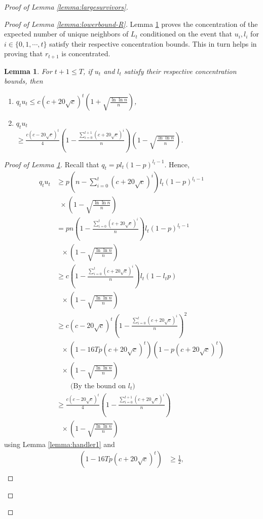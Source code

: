 \documentclass[11pt]{article}
\newtheorem{lemma}[theorem]{Lemma}
\begin{document}
\begin{proof}[Proof of Lemma \ref{lemma:largesurvivors}]
\begin{proof}[Proof of Lemma \ref{lemma:lowerbound-R}]
Lemma \ref{lemma:lowerbound-qu} proves the concentration of the expected number of unique neighbors of $L_t$ conditioned on the event that $u_i,l_i$ for $i\in\{0,1,\cdots,t\}$ satisfy their respective concentration bounds. This in turn helps in proving that $r_{t+1}$ is concentrated.
\begin{lemma}\label{lemma:lowerbound-qu}
For $t+1\leq T$, if $u_t$ and $l_t$ satisfy their respective concentration bounds, then
\begin{enumerate}
\item $q_tu_t \leq c(c+20\sqrt{c})^{t}\left(1+\sqrt{\frac{\ln{\ln{n}}}{n}}\right)$,
\item $q_tu_t$\\
$\geq \frac{c(c-20\sqrt{c})^{t}}{4} \left(1-\frac{\sum_{i=0}^{t+1}(c+20\sqrt{c})^i}{n}\right)\left(1-\sqrt{\frac{\ln{\ln{n}}}{n}}\right)$.
\end{enumerate}
\end{lemma}
\begin{proof}[Proof of Lemma \ref{lemma:lowerbound-qu}]
Recall that $q_t=pl_t(1-p)^{l_t-1}$. Hence, \begin{align*}
q_tu_t &\geq p(n-\sum_{i=0}^t(c+20\sqrt{c})^i)l_t(1-p)^{l_t-1}\\
&\ \ \times\left(1-\sqrt{\frac{\ln{\ln{n}}}{n}}\right)\\
 &= pn\left(1-\frac{\sum_{i=0}^t(c+20\sqrt{c})^i}{n}\right)l_t(1-p)^{l_t-1}\\
 &\ \ \ \times \left(1-\sqrt{\frac{\ln{\ln{n}}}{n}}\right)\\
 &\geq c\left(1-\frac{\sum_{i=0}^t(c+20\sqrt{c})^i}{n}\right)l_t(1-l_tp)\\
 &\ \ \ \times \left(1-\sqrt{\frac{\ln{\ln{n}}}{n}}\right)\\
 &\geq c(c-20\sqrt{c})^{t}\left(1-\frac{\sum_{i=0}^t(c+20\sqrt{c})^i}{n}\right)^2\\
 &\ \ \ \times(1-16Tp(c+20\sqrt{c})^t)(1-p(c+20\sqrt{c})^t)\\
 &\ \ \ \times\left(1-\sqrt{\frac{\ln{\ln{n}}}{n}}\right)\\
&\quad \quad \text{(By the bound on $l_t$)}\\
&\geq \frac{c(c-20\sqrt{c})^{t}}{4} \left(1-\frac{\sum_{i=0}^{t+1}(c+20\sqrt{c})^i}{n}\right)\\
 &\ \ \ \times\left(1-\sqrt{\frac{\ln{\ln{n}}}{n}}\right)
\end{align*}
using Lemma \ref{lemma:handler1} and
\begin{align*}
(1-16Tp(c+20\sqrt{c})^t) &\geq \frac{1}{2},\\

\end{align*}
\end{proof}
\end{proof}
\end{proof}
\end{document}
